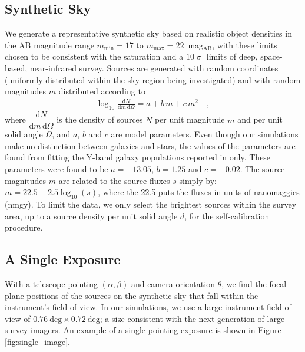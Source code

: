 \documentclass[preprint,pdftex]{aastex}
\newcommand{\dd}{\text{d}}
\begin{document}
\subsection{Synthetic Sky}
We generate a representative synthetic sky based on realistic object densities in the AB magnitude range $m_\text{min} = 17$ to $m_\text{max} = 22$~mag$_\text{AB}$, with these limits chosen to be consistent with the saturation and a $10\upsigma{}$ limits of deep, space-based, near-infrared survey. Sources are generated with random coordinates (uniformly distributed within the sky region being investigated) and with random magnitudes $m$ distributed according to
\begin{eqnarray}
\log_{10} \frac{\dd N}{\dd m \, \dd \Omega} = a + b\,m + c\,m^2 \label{eqn:power_law} \quad , 
\end{eqnarray}
where $\dfrac{\dd N}{\dd m \, \dd  \Omega}$  is the density of sources $N$ per unit magnitude $m$ and per unit solid angle $\Omega$, and $a$, $b$ and $c$ are model parameters. Even though our simulations make no distinction between galaxies and stars, the values of the parameters are found from fitting the Y-band galaxy populations reported in \citet{win11} only. These parameters were found to be $a = -13.05$, $b = 1.25$ and $c = -0.02$. The source magnitudes $m$ are related to the source fluxes $s$ simply by: $m = 22.5 - 2.5\log_{10}(s)$, where the 22.5 puts the fluxes in units of nanomaggies (nmgy). To limit the data, we only select the brightest sources within the survey area, up to a source density per unit solid angle $d$, for the self-calibration procedure.

\subsection{A Single Exposure}
\label{sec:single_exposure}
With a telescope pointing $(\alpha, \beta)$ and camera orientation $\theta$, we find the focal plane positions of the sources on the synthetic sky that fall within the instrument's field-of-view. In our simulations, we use a large instrument field-of-view of $0.76~ \text{deg} \times 0.72~\text{deg}$; a size consistent with the next generation of large survey imagers. An example of a single pointing exposure is shown in Figure \ref{fig:single_image}.
\end{document}
